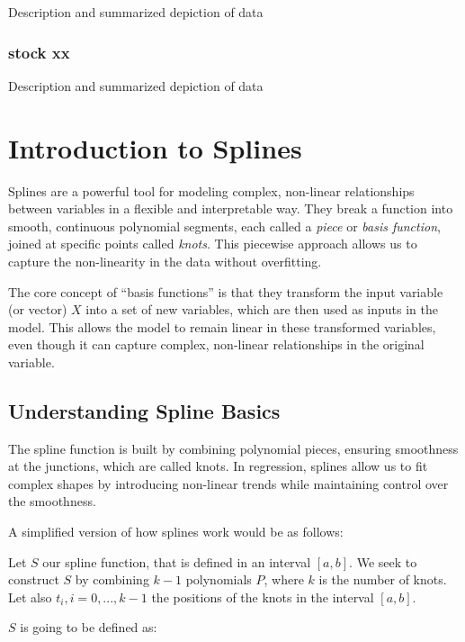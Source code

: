 \documentclass[
]{book}
\begin{document}
Description and summarized depiction of data

\hypertarget{stock-xx-2}{%
\subsection{stock xx}\label{stock-xx-2}}

Description and summarized depiction of data

\hypertarget{introduction-to-splines}{%
\chapter{Introduction to Splines}\label{introduction-to-splines}}

Splines are a powerful tool for modeling complex, non-linear relationships between variables in a flexible and interpretable way. They break a function into smooth, continuous polynomial segments, each called a \emph{piece} or \emph{basis function}, joined at specific points called \emph{knots}. This piecewise approach allows us to capture the non-linearity in the data without overfitting.

The core concept of ``basis functions'' is that they transform the input variable (or vector) \(X\) into a set of new variables, which are then used as inputs in the model. This allows the model to remain linear in these transformed variables, even though it can capture complex, non-linear relationships in the original variable.

\hypertarget{understanding-spline-basics}{%
\section{Understanding Spline Basics}\label{understanding-spline-basics}}

The spline function is built by combining polynomial pieces, ensuring smoothness at the junctions, which are called knots. In regression, splines allow us to fit complex shapes by introducing non-linear trends while maintaining control over the smoothness.

A simplified version of how splines work would be as follows:

Let \(S\) our spline function, that is defined in an interval \([a,b]\). We seek to construct \(S\) by combining \(k-1\) polynomials \(P\), where \(k\) is the number of knots. Let also \(t_{i}, i = 0, ..., k-1\) the positions of the knots in the interval \([a,b]\).

\(S\) is going to be defined as:
\end{document}
